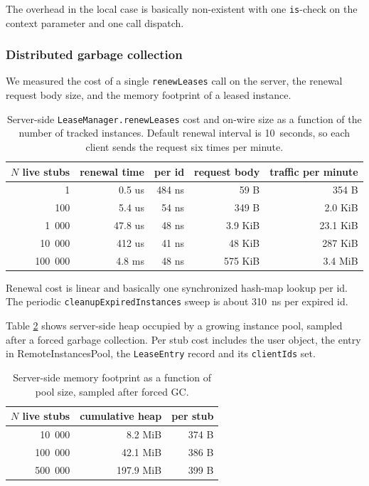 \documentclass[a4paper,11pt,oneside]{article}
\newcommand{\kotlini}[1]{\texttt{#1}}
\begin{document}
The overhead in the local case is basically non-existent with one \kotlini{is}-check on the context
parameter and one call dispatch.

\subsubsection{Distributed garbage collection}\label{dgc_section}

We measured the cost of a single \kotlini{renewLeases} call on the server, the renewal
request body size, and the memory footprint of a leased instance.

\begin{table}[!h]
  \begin{center}
    \begin{tabular}{rrrrr}
      \toprule
      $N$ live stubs & renewal time & per id & request body & traffic per minute \\
      \midrule
      1       &  0.5 us  & 484 ns &  59 B   &   354 B \\
      100     &  5.4 us  &  54 ns & 349 B   &  2.0 KiB \\
      1~000   & 47.8 us  &  48 ns & 3.9 KiB & 23.1 KiB \\
      10~000  &  412 us  &  41 ns & 48 KiB  &  287 KiB \\
      100~000 &  4.8 ms  &  48 ns & 575 KiB & 3.4 MiB \\
      \bottomrule
    \end{tabular}
    \caption{Server-side \kotlini{LeaseManager.renewLeases} cost and on-wire size as a
    function of the number of tracked instances. Default renewal interval is 10~seconds,
    so each client sends the request six times per minute.}\label{lease_renewal_table}
  \end{center}
\end{table}

Renewal cost is linear and basically one synchronized hash-map lookup per id. The
periodic \kotlini{cleanupExpiredInstances} sweep is about 310~ns per expired id.

Table \ref{lease_memory_table} shows server-side heap occupied by a growing instance
pool, sampled after a forced garbage collection. Per stub cost includes the user
object, the entry in RemoteInstancesPool, the \kotlini{LeaseEntry} record
and its \kotlini{clientIds} set.

\begin{table}[!h]
  \begin{center}
    \begin{tabular}{rrr}
      \toprule
      $N$ live stubs & cumulative heap & per stub \\
      \midrule
      10~000  &   8.2 MiB & 374 B \\
      100~000 &  42.1 MiB & 386 B \\
      500~000 & 197.9 MiB & 399 B \\
      \bottomrule
    \end{tabular}
    \caption{Server-side memory footprint as a function of pool size, sampled after
    forced GC.}\label{lease_memory_table}
  \end{center}
\end{table}
\end{document}
